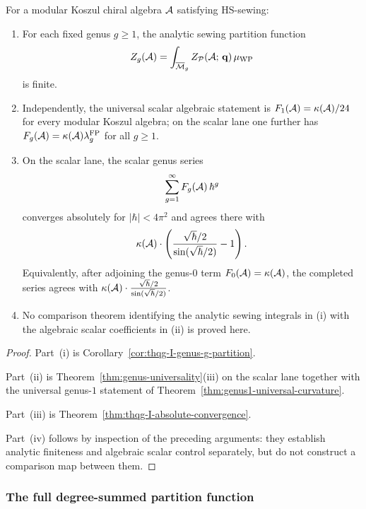 \begin{proposition}
\label{prop:thqg-I-consistency}
For a modular Koszul chiral algebra $\mathcal{A}$ satisfying HS-sewing:
\begin{enumerate}[label=\textup{(\roman*)}]
\item For each fixed genus $g \geq 1$, the analytic sewing partition
function
\[
Z_g(\mathcal{A}) = \int_{\overline{\mathcal{M}}_g}
Z_{\mathcal{P}}(\mathcal{A};\,\mathbf{q})\,\mu_{\mathrm{WP}}
\]
is finite.
\item Independently, the universal scalar algebraic statement is
$F_1(\mathcal{A})=\kappa(\mathcal{A})/24$ for every modular Koszul algebra; on the
scalar lane one further has
$F_g(\mathcal{A})=\kappa(\mathcal{A})\lambda_g^{\mathrm{FP}}$ for all $g \geq 1$.
\item On the scalar lane, the scalar genus series
\[
\sum_{g=1}^{\infty} F_g(\mathcal{A})\,\hbar^g
\]
converges absolutely for $|\hbar| < 4\pi^2$ and agrees there with
\[
\kappa(\mathcal{A})\cdot\left(\frac{\sqrt{\hbar}/2}{\sin(\sqrt{\hbar}/2)} - 1\right).
\]
Equivalently, after adjoining the genus-$0$ term
$F_0(\mathcal{A})=\kappa(\mathcal{A})$, the completed series agrees with
$\kappa(\mathcal{A})\cdot\frac{\sqrt{\hbar}/2}{\sin(\sqrt{\hbar}/2)}$.
\item No comparison theorem identifying the analytic sewing integrals
in \textup{(i)} with the algebraic scalar coefficients in
\textup{(ii)} is proved here.
\end{enumerate}
\end{proposition}

\begin{proof}
Part~(i) is Corollary~\ref{cor:thqg-I-genus-g-partition}.

Part~(ii) is Theorem~\ref{thm:genus-universality}\textup{(iii)} on the
scalar lane together with the universal genus-$1$
statement of Theorem~\ref{thm:genus1-universal-curvature}.

Part~(iii) is Theorem~\ref{thm:thqg-I-absolute-convergence}.

Part~(iv) follows by inspection of the preceding arguments: they
establish analytic finiteness and algebraic scalar control separately,
but do not construct a comparison map between them.
\end{proof}

\subsubsection{The full degree-summed partition function}

